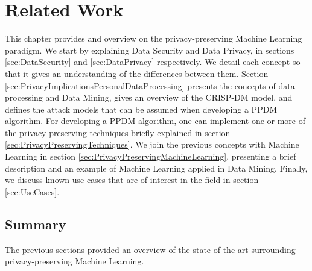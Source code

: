 %

\acresetall

\chapter{Related Work}
\label{ch:RelatedWork}


This chapter provides and overview on the privacy-preserving Machine Learning paradigm.
We start by explaining Data Security and Data Privacy, in sections \ref{sec:DataSecurity} and \ref{sec:DataPrivacy} respectively. We detail each concept so that it gives an understanding of the differences between them.
Section \ref{sec:PrivacyImplicationsPersonalDataProcessing} presents the concepts of data processing and Data Mining, gives an overview of the CRISP-DM model, and defines the attack models that can be assumed when developing a \ac{PPDM} algorithm.
For developing a \ac{PPDM} algorithm, one can implement one or more of the privacy-preserving techniques briefly explained in section \ref{sec:PrivacyPreservingTechniques}. 
We join the previous concepts with Machine Learning in section \ref{sec:PrivacyPreservingMachineLearning}, presenting a brief description and an example of Machine Learning applied in Data Mining. Finally, we discuss known use cases that are of interest in the field in section \ref{sec:UseCases}.









\section{Summary}
\label{sec:SummaryRelatedWork}

The previous sections provided an overview of the state of the art surrounding privacy-preserving Machine Learning.

